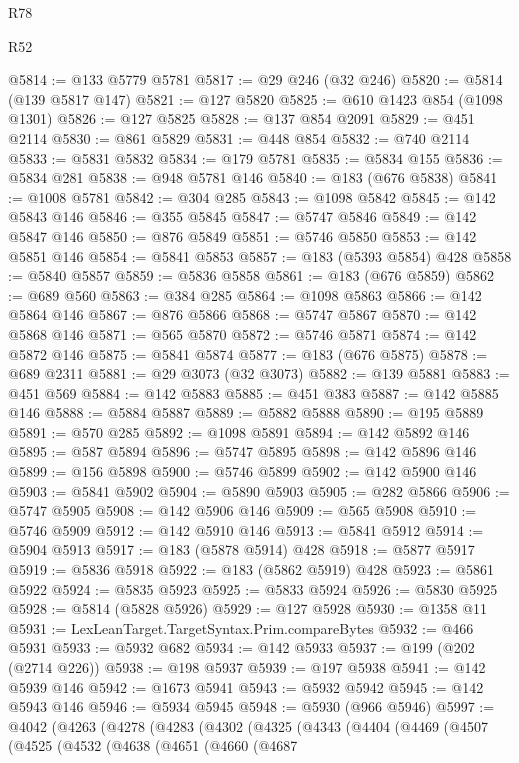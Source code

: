 \begin{lexlean}{R78}
\begin{lexlean}{R52}
\begin{coremodule}
{{{{{{{{{{{{{{{{{{{{{{{{{{{{{{{{{{{{{{{{{{{{{{{{{{{{{{{{{{{{{{{{{{{{{{{{{{{{{{{{{{{{{{{{{{{{{{{{{{{{{{{{{{{{{{{{{{{{{{{{{{{{{{{{{{{{{{{{{{{{{{{{{{{{{{{{{{{{{{{{{{{{{{{{{{{{{{{{{{{{{{{{{{{{{{{{{{{{{{@5814 := @133 @5779 @5781
@5817 := @29 @246 (@32 @246)
@5820 := @5814 (@139 @5817 @147)
@5821 := @127 @5820
@5825 := @610 @1423 @854 (@1098 @1301)
@5826 := @127 @5825
@5828 := @137 @854 @2091
@5829 := @451 @2114
@5830 := @861 @5829
@5831 := @448 @854
@5832 := @740 @2114
@5833 := @5831 @5832
@5834 := @179 @5781
@5835 := @5834 @155
@5836 := @5834 @281
@5838 := @948 @5781 @146
@5840 := @183 (@676 @5838)
@5841 := @1008 @5781
@5842 := @304 @285
@5843 := @1098 @5842
@5845 := @142 @5843 @146
@5846 := @355 @5845
@5847 := @5747 @5846
@5849 := @142 @5847 @146
@5850 := @876 @5849
@5851 := @5746 @5850
@5853 := @142 @5851 @146
@5854 := @5841 @5853
@5857 := @183 (@5393 @5854) @428
@5858 := @5840 @5857
@5859 := @5836 @5858
@5861 := @183 (@676 @5859)
@5862 := @689 @560
@5863 := @384 @285
@5864 := @1098 @5863
@5866 := @142 @5864 @146
@5867 := @876 @5866
@5868 := @5747 @5867
@5870 := @142 @5868 @146
@5871 := @565 @5870
@5872 := @5746 @5871
@5874 := @142 @5872 @146
@5875 := @5841 @5874
@5877 := @183 (@676 @5875)
@5878 := @689 @2311
@5881 := @29 @3073 (@32 @3073)
@5882 := @139 @5881
@5883 := @451 @569
@5884 := @142 @5883
@5885 := @451 @383
@5887 := @142 @5885 @146
@5888 := @5884 @5887
@5889 := @5882 @5888
@5890 := @195 @5889
@5891 := @570 @285
@5892 := @1098 @5891
@5894 := @142 @5892 @146
@5895 := @587 @5894
@5896 := @5747 @5895
@5898 := @142 @5896 @146
@5899 := @156 @5898
@5900 := @5746 @5899
@5902 := @142 @5900 @146
@5903 := @5841 @5902
@5904 := @5890 @5903
@5905 := @282 @5866
@5906 := @5747 @5905
@5908 := @142 @5906 @146
@5909 := @565 @5908
@5910 := @5746 @5909
@5912 := @142 @5910 @146
@5913 := @5841 @5912
@5914 := @5904 @5913
@5917 := @183 (@5878 @5914) @428
@5918 := @5877 @5917
@5919 := @5836 @5918
@5922 := @183 (@5862 @5919) @428
@5923 := @5861 @5922
@5924 := @5835 @5923
@5925 := @5833 @5924
@5926 := @5830 @5925
@5928 := @5814 (@5828 @5926)
@5929 := @127 @5928
@5930 := @1358 @11
@5931 := LexLeanTarget.TargetSyntax.Prim.compareBytes
@5932 := @466 @5931
@5933 := @5932 @682
@5934 := @142 @5933
@5937 := @199 (@202 (@2714 @226))
@5938 := @198 @5937
@5939 := @197 @5938
@5941 := @142 @5939 @146
@5942 := @1673 @5941
@5943 := @5932 @5942
@5945 := @142 @5943 @146
@5946 := @5934 @5945
@5948 := @5930 (@966 @5946)
@5997 := @4042
    (@4263
      (@4278
        (@4283
          (@4302
            (@4325
              (@4343
                (@4404
                  (@4469
                    (@4507
                      (@4525
                        (@4532
                          (@4638
                            (@4651
                              (@4660
                                (@4687
}}}}}}}}}}}}}}}}}}}}}}}}}}}}}}}}}}}}}}}}}}}}}}}}}}}}}}}}}}}}}}}}}}}}}}}}}}}}}}}}}}}}}}}}}}}}}}}}}}}}}}}}}}}}}}}}}}}}}}}}}}}}}}}}}}}}}}}}}}}}}}}}}}}}}}}}}}}}}}}}}}}}}}}}}}}}}}}}}}}}}}}}}}}}}}}}}}}}}}
\end{coremodule}
\end{lexlean}
\end{lexlean}
